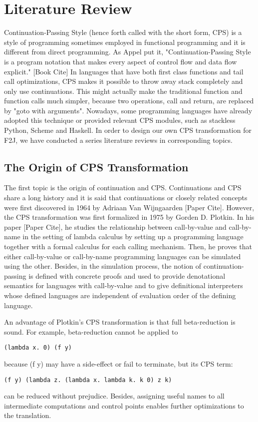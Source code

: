 \chapter{Literature Review}

Continuation-Passing Style (hence forth called with the short form, CPS) is a style of programming sometimes employed in functional programming and it is different from direct programming. As Appel put it, "Continuation-Passing Style is a program notation that makes every aspect of control flow and data flow explicit." [Book Cite] In languages that have both first class functions and tail call optimizations, CPS makes it possible to throw away stack completely and only use continuations. This might actually make the traditional function and function calls much simpler, because two operations, call and return, are replaced by "goto with arguments". Nowadays, some programming languages have already adopted this technique or provided relevant CPS modules, such as stackless Python, Scheme and Haskell. In order to design our own CPS transformation for F2J, we have conducted a series literature reviews in corresponding topics.

\section{The Origin of CPS Transformation}

The first topic is the origin of continuation and CPS. Continuations and CPS share a long history and it is said that continuations or closely related concepts were first discovered in 1964 by Adriaan Van Wijngaarden [Paper Cite]. However, the CPS transformation was first formalized in 1975 by Gorden D. Plotkin. In his paper [Paper Cite], he studies the relationship between call-by-value and call-by-name in the setting of lambda calculus by setting up a programming language together with a formal calculus for each calling mechanism. Then, he proves that either call-by-value or call-by-name programming languages can be simulated using the other. Besides, in the simulation process, the notion of continuation-passing is defined with concrete proofs and used to provide denotational semantics for languages with call-by-value and to give definitional interpreters whose defined languages are independent of evaluation order of the defining language. 

An advantage of Plotkin's CPS transformation is that full beta-reduction is sound. For example, beta-reduction cannot be applied to 
\begin{lstlisting}[language=Lambda]
	(lambda x. 0) (f y) 
\end{lstlisting}
because (f y) may have a side-effect or fail to terminate, but its CPS term:
\begin{lstlisting}[language=Lambda]
	(f y) (lambda z. (lambda x. lambda k. k 0) z k) 
\end{lstlisting}
can be reduced without prejudice. Besides, assigning useful names to all intermediate computations and control points enables further optimizations to the translation.


